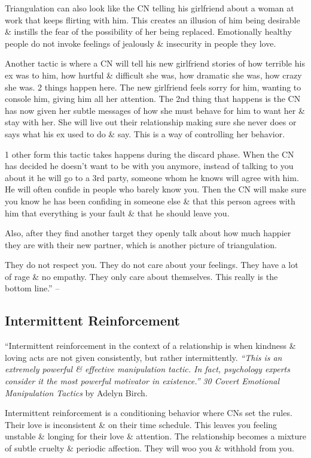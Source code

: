 \documentclass{article}
\numberwithin{equation}{section}
\begin{document}
Triangulation can also look like the CN telling his girlfriend about a woman at work that keeps flirting with him. This creates an illusion of him being desirable \& instills the fear of the possibility of her being replaced. Emotionally healthy people do not invoke feelings of jealously \& insecurity in people they love.

Another tactic is where a CN will tell his new girlfriend stories of how terrible his ex was to him, how hurtful \& difficult she was, how dramatic she was, how crazy she was. 2 things happen here. The new girlfriend feels sorry for him, wanting to console him, giving him all her attention. The 2nd thing that happens is the CN has now given her subtle messages of how she must behave for him to want her \& stay with her. She will live out their relationship making sure she never does or says what his ex used to do \& say. This is a way of controlling her behavior.

1 other form this tactic takes happens during the discard phase. When the CN has decided he doesn't want to be with you anymore, instead of talking to you about it he will go to a 3rd party, someone whom he knows will agree with him. He will often confide in people who barely know you. Then the CN will make sure you know he has been confiding in someone else \& that this person agrees with him that everything is your fault \& that he should leave you.

Also, after they find another target they openly talk about how much happier they are with their new partner, which is another picture of triangulation.

They do not respect you. They do not care about your feelings. They have a lot of rage \& no empathy. They only care about themselves. This really is the bottom line.'' -- \cite[pp. 75--78]{Mirza2017}

\subsection{Intermittent Reinforcement}
``Intermittent reinforcement in the context of a relationship is when kindness \& loving acts are not given consistently, but rather intermittently. \textit{``This is an extremely powerful \& effective manipulation tactic. In fact, psychology experts consider it the most powerful motivator in existence.''} \textit{30 Covert Emotional Manipulation Tactics} by Adelyn Birch.

Intermittent reinforcement is a conditioning behavior where CNs set the rules. Their love is inconsistent \& on their time schedule. This leaves you feeling unstable \& longing for their love \& attention. The relationship becomes a mixture of subtle cruelty \& periodic affection. They will woo you \& withhold from you.
\end{document}
